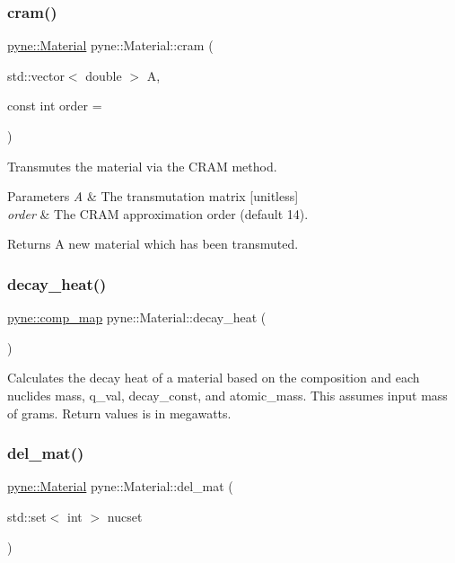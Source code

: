 \subsubsection{\texorpdfstring{cram()}{cram()}}
{\footnotesize\ttfamily \hyperlink{classpyne_1_1_material}{pyne\+::\+Material} pyne\+::\+Material\+::cram (\begin{DoxyParamCaption}\item[{std\+::vector$<$ double $>$}]{A,  }\item[{const int}]{order = {} }\end{DoxyParamCaption})}

Transmutes the material via the C\+R\+AM method. 
\begin{DoxyParams}{Parameters}
{\em A} & The transmutation matrix \mbox{[}unitless\mbox{]} \\
\hline
{\em order} & The C\+R\+AM approximation order (default 14). \\
\hline
\end{DoxyParams}
\begin{DoxyReturn}{Returns}
A new material which has been transmuted. 
\end{DoxyReturn}
\mbox{\label{classpyne_1_1_material_afa2f1337b64376c13bcece406bbc70f1}} 
\subsubsection{\texorpdfstring{decay\+\_\+heat()}{decay\_heat()}}
{\footnotesize\ttfamily \hyperlink{namespacepyne_a86738cecccf4ce3f4ecc2ff6f45ce1a2}{pyne\+::comp\+\_\+map} pyne\+::\+Material\+::decay\+\_\+heat (\begin{DoxyParamCaption}{ }\end{DoxyParamCaption})}

Calculates the decay heat of a material based on the composition and each nuclide\textquotesingle{}s mass, q\+\_\+val, decay\+\_\+const, and atomic\+\_\+mass. This assumes input mass of grams. Return values is in megawatts. \mbox{\label{classpyne_1_1_material_a34944c4d3c0627ea41d5c7631d080094}} 
\subsubsection{\texorpdfstring{del\+\_\+mat()}{del\_mat()}\hspace{0.1cm}{\footnotesize\ttfamily [1/2]}}
{\footnotesize\ttfamily \hyperlink{classpyne_1_1_material}{pyne\+::\+Material} pyne\+::\+Material\+::del\+\_\+mat (\begin{DoxyParamCaption}\item[{std\+::set$<$ int $>$}]{nucset }\end{DoxyParamCaption})}

